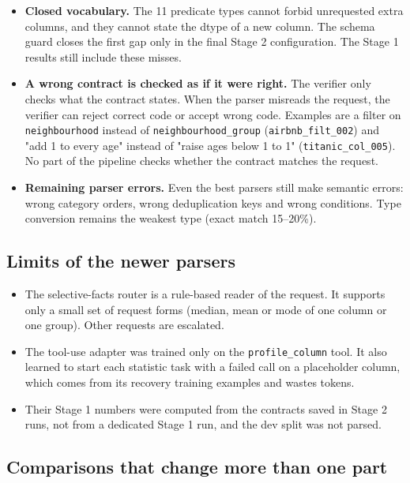 \documentclass[11pt]{article}
\providecommand{\tightlist}{\setlength{\itemsep}{0pt}\setlength{\parskip}{0pt}}
\begin{document}
\begin{itemize}
\tightlist
\item
  \textbf{Closed vocabulary.} The 11 predicate types cannot forbid
  unrequested extra columns, and they cannot state the dtype of a new
  column. The schema guard closes the first gap only in the final Stage
  2 configuration. The Stage 1 results still include these misses.
\item
  \textbf{A wrong contract is checked as if it were right.} The verifier
  only checks what the contract states. When the parser misreads the
  request, the verifier can reject correct code or accept wrong code.
  Examples are a filter on \texttt{neighbourhood} instead of
  \texttt{neighbourhood\_\allowbreak{}group}
  (\texttt{airbnb\_\allowbreak{}filt\_\allowbreak{}002}) and "add 1 to
  every age" instead of "raise ages below 1 to 1"
  (\texttt{titanic\_\allowbreak{}col\_\allowbreak{}005}). No part of the
  pipeline checks whether the contract matches the request.
\item
  \textbf{Remaining parser errors.} Even the best parsers still make
  semantic errors: wrong category orders, wrong deduplication keys and
  wrong conditions. Type conversion remains the weakest type (exact
  match 15--20\%).
\end{itemize}

\subsection{Limits of the newer parsers}

\begin{itemize}
\tightlist
\item
  The selective-facts router is a rule-based reader of the request. It
  supports only a small set of request forms (median, mean or mode of
  one column or one group). Other requests are escalated.
\item
  The tool-use adapter was trained only on the
  \texttt{profile\_\allowbreak{}column} tool. It also learned to start
  each statistic task with a failed call on a placeholder column, which
  comes from its recovery training examples and wastes tokens.
\item
  Their Stage 1 numbers were computed from the contracts saved in Stage
  2 runs, not from a dedicated Stage 1 run, and the dev split was not
  parsed.
\end{itemize}

\subsection{Comparisons that change more than one part}
\end{document}
